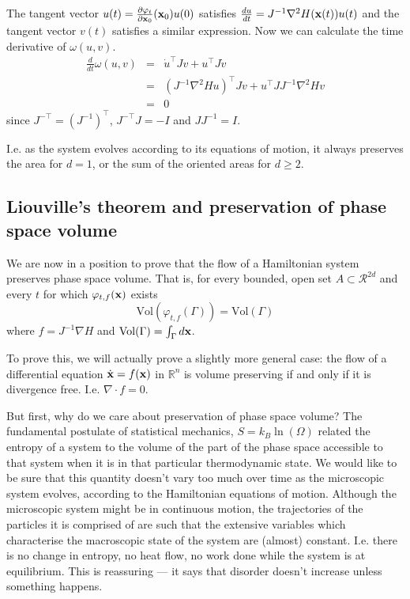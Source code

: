 \documentclass{article}
\begin{document}
The tangent vector $u(t) = \frac{\partial \varphi_t}{\partial {\bf x}_0}({\bf x}_0)u(0)$ satisfies $\frac{du}{dt} = J^{-1}\nabla^2H({\bf x}(t))u(t)$ and the tangent vector $v(t)$ satisfies a similar expression. Now we can calculate the time derivative of $\omega(u,v)$.
\begin{eqnarray*}
	\frac{d}{dt}\omega(u,v) &=& \dot{u}^{\top}Jv+u^\top J\dot{v}\\
		&=& (J^{-1}\nabla^2Hu)^\top Jv + u^\top JJ^{-1}\nabla^2Hv\\
		&=& 0
\end{eqnarray*}
since $J^{-\top}=(J^{-1})^\top$, $J^{-\top}J=-I$ and $JJ^{-1} = I$.

I.e. as the system evolves according to its equations of motion, it always preserves the area for $d=1$, or the sum of the oriented areas for $d \geq2$.


\subsection{Liouville's theorem and preservation of phase space volume}
We are now in a position to prove that the flow of a Hamiltonian system preserves phase space volume. That is, for every bounded, open set $A\subset\mathcal{R}^{2d}$ and every $t$ for which $\varphi_{t,f}({\bf x})$ exists
$$\text{Vol}(\varphi_{t,f}(\Gamma))=\text{Vol}(\Gamma)$$
where $f=J^{-1}\nabla H$ and $\text{Vol}(\Gamma) = \int_{\Gamma}d{\bf x}$.

To prove this, we will actually prove a slightly more general case: the flow of a differential equation $\dot{\bf x}=f({\bf x})$ in $\mathbb{R}^n$ is volume preserving if and only if it is divergence free. I.e. $\nabla\cdot f=0$.

But first, why do we care about preservation of phase space volume? The fundamental postulate of statistical mechanics, $S=k_B\ln(\Omega)$ related the entropy of a system to the volume of the part of the phase space accessible to that system when it is in that particular thermodynamic state. We would like to be sure that this quantity doesn't vary too much over time as the microscopic system evolves, according to the Hamiltonian equations of motion. Although the microscopic system might be in continuous motion, the trajectories of the particles it is comprised of are such that the extensive variables which characterise the macroscopic state of the system are (almost) constant. I.e. there is no change in entropy, no heat flow, no work done while the system is at equilibrium. This is reassuring --- it says that disorder doesn't increase unless something happens.
\end{document}
